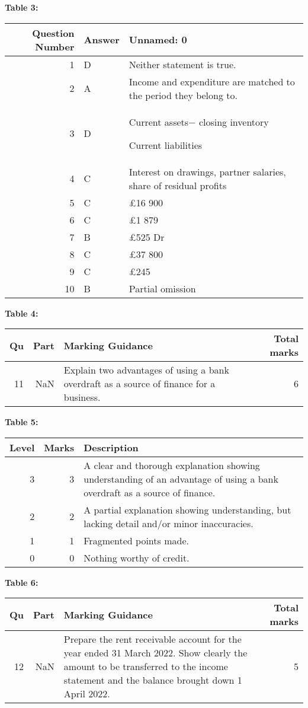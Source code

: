 \documentclass{article}
\begin{document}
\textbf{Table 3:}
\begin{tabular}{rll}
\toprule
Question
Number & Answer & Unnamed: 0 \\
\midrule
1 & D & Neither statement is true. \\
2 & A & Income and expenditure are matched to the period they belong to. \\
3 & D & Current assets− closing inventory

Current liabilities \\
4 & C & Interest on drawings, partner salaries, share of residual profits \\
5 & C & £16 900 \\
6 & C & £1 879 \\
7 & B & £525 Dr \\
8 & C & £37 800 \\
9 & C & £245 \\
10 & B & Partial omission \\
\bottomrule
\end{tabular}

\textbf{Table 4:}
\begin{tabular}{rrlr}
\toprule
Qu & Part & Marking Guidance & Total
marks \\
\midrule
11 & NaN & Explain two advantages of using a bank overdraft as a source of finance for a
business. & 6 \\
\bottomrule
\end{tabular}

\textbf{Table 5:}
\begin{tabular}{rrl}
\toprule
Level & Marks & Description \\
\midrule
3 & 3 & A clear and thorough explanation showing understanding of an advantage of using a
bank overdraft as a source of finance. \\
2 & 2 & A partial explanation showing understanding, but lacking detail and/or minor
inaccuracies. \\
1 & 1 & Fragmented points made. \\
0 & 0 & Nothing worthy of credit. \\
\bottomrule
\end{tabular}

\textbf{Table 6:}
\begin{tabular}{rrlr}
\toprule
Qu & Part & Marking Guidance & Total
marks \\
\midrule
12 & NaN & Prepare the rent receivable account for the year ended 31 March 2022.
Show clearly the amount to be transferred to the income statement and the
balance brought down 1 April 2022. & 5 \\
\bottomrule
\end{tabular}
\end{document}
